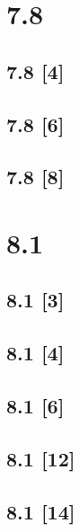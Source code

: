 \documentclass{article}
\begin{document}
\newpage

\section*{7.8}
\setcounter{equation}{0}

\subsection*{7.8 [4]}
\subsection*{7.8 [6]}
\subsection*{7.8 [8]}

\newpage

\section*{8.1}
\setcounter{equation}{0}

\subsection*{8.1 [3]}
\subsection*{8.1 [4]}
\subsection*{8.1 [6]}
\subsection*{8.1 [12]}
\subsection*{8.1 [14]}
\end{document}
